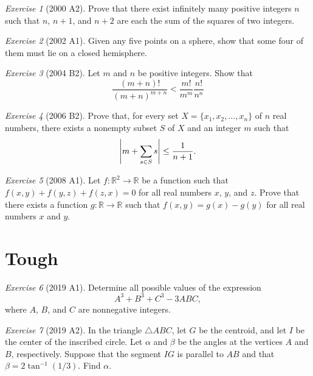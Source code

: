 \documentclass{article}
\theoremstyle{definition}
\theoremstyle{remark}
\newtheorem{exercise}{Exercise}
\newcommand{\RR}{\mathbb{R}}
\begin{document}
\begin{exercise}[2000 A2]
    Prove that there exist infinitely many positive integers \(n\) such that \(n\), \(n+1\), and \(n+2\) are each the sum of the squares of two integers.
\end{exercise}

\begin{exercise}[2002 A1]
    Given any five points on a sphere, show that some four of them must lie on a closed hemisphere.
\end{exercise}

\begin{exercise}[2004 B2]
    Let \(m\) and \(n\) be positive integers.
    Show that
    \[\frac{(m+n)!}{(m+n)^{m+n}}<\frac{m!}{m^m}\frac{n!}{n^n}\]
\end{exercise}

\begin{exercise}[2006 B2]
    Prove that, for every set \(X=\{x_1,x_2,\ldots,x_n\}\) of \(n\) real numbers, there exists a nonempty subset \(S\) of \(X\) and an integer \(m\) such that
    \[\abs{m+\sum_{s\in S}s}\leq \frac{1}{n+1}.\]
\end{exercise}

\begin{exercise}[2008 A1]
    Let \(f:\RR^2\to\RR\) be a function such that \(f(x,y)+f(y,z)+f(z,x)=0\) for all real numbers \(x\), \(y\), and \(z\).
    Prove that there exists a function \(g:\RR\to\RR\) such that \(f(x,y)=g(x)-g(y)\) for all real numbers \(x\) and \(y\).
\end{exercise}

\section{Tough}

\begin{exercise}[2019 A1]
    Determine all possible values of the expression
    \[A^3+B^3+C^3-3ABC,\]
    where \(A\), \(B\), and \(C\) are nonnegative integers.
\end{exercise}

\begin{exercise}[2019 A2]
    In the triangle \(\triangle ABC\), let \(G\) be the centroid, and let \(I\) be the center of the inscribed circle.
    Let \(\alpha\) and \(\beta\) be the angles at the vertices \(A\) and \(B\), respectively.
    Suppose that the segment \(IG\) is parallel to \(AB\) and that \(\beta=2\tan^{-1}(1/3)\).
    Find \(\alpha\).
\end{exercise}
\end{document}
